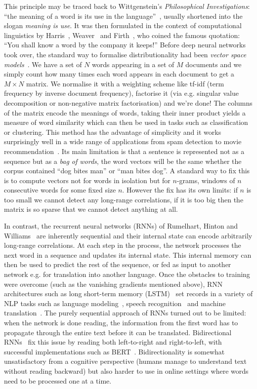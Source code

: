 This principle may be traced back to Wittgenstein's \emph{Philosophical Investigations}: ``the meaning of a word is its use in the language''~\cite{Wittgenstein53}, usually shortened into the slogan \emph{meaning is use}.
It was then formulated in the context of computational linguistics by Harris~\cite{Harris54}, Weaver~\cite{Weaver55} and Firth~\cite{Firth57}, who coined the famous quotation: ``You shall know a word by the company it keeps!''
Before deep neural networks took over, the standard way to formalise distributionality had been \emph{vector space models}~\cite{SaltonEtAl75}.
We have a set of $N$ words appearing in a set of $M$ documents and we simply count how many times each word appears in each document to get a $M \times N$ matrix.
We normalise it with a weighting scheme like tf-idf (term frequency by inverse document frequency), factorise it (via e.g. singular value decomposition or non-negative matrix factorisation) and we're done!
The columns of the matrix encode the meanings of words, taking their inner product yields a measure of word similarity which can then be used in tasks such as classification or clustering.
This method has the advantage of simplicity and it works surprisingly well in a wide range of applications from spam detection to movie recommendation~\cite{TurneyPantel10}.
Its main limitation is that a sentence is represented not as a sequence but as a \emph{bag of words}, the word vectors will be the same whether the corpus contained ``dog bites man'' or ``man bites dog''.
A standard way to fix this is to compute vectors not for words in isolation but for $n$-grams, windows of $n$ consecutive words for some fixed size $n$.
However the fix has its own limits: if $n$ is too small we cannot detect any long-range correlations, if it is too big then the matrix is so sparse that we cannot detect anything at all.

In contrast, the recurrent neural networks (RNNs) of Rumelhart, Hinton and Williams~\cite{RumelhartEtAl86} are inherently sequential and their internal state can encode arbitrarily long-range correlations.
At each step in the process, the network processes the next word in a sequence and updates its internal state.
This internal memory can then be used to predict the rest of the sequence, or fed as input to another network e.g. for translation into another language.
Once the obstacles to training were overcome (such as the vanishing gradients mentioned above), RNN architectures such as long short-term memory (LSTM)~\cite{HochreiterSchmidhuber97} set records in a variety of NLP tasks such as language modeling~\cite{SutskeverEtAl11}, speech recognition~\cite{GravesEtAl13} and machine translation~\cite{SutskeverEtAl14}.
The purely sequential approach of RNNs turned out to be limited: when the network is done reading, the information from the first word has to propagate through the entire text before it can be translated.
Bidirectional RNNs~\cite{SchusterPaliwal97} fix this issue by reading both left-to-right and right-to-left, with successful implementations such as BERT~\cite{DevlinEtAl19}.
Bidirectionality is somewhat unsatisfactory from a cognitive perspective (humans manage to understand text without reading backward) but also harder to use in online settings where words need to be processed one at a time.

